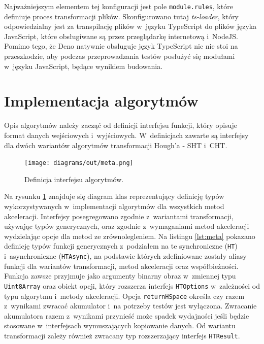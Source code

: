 Najważniejszym elementem tej konfiguracji jest pole \lstinline{module.rules}, które definiuje proces transformacji plików. Skonfigurowano tutaj \textit{ts-loader}, który odpowiedzialny jest za transpilację plików w~języku TypeScript do plików języka JavaScript, które obsługiwane są przez przeglądarkę internetową i~NodeJS. Pomimo tego, że Deno natywnie obsługuje język TypeScript nic nie stoi na przeszkodzie, aby podczas przeprowadzania testów posłużyć się modułami w~języku JavaScript, będące wynikiem budowania.

\section{Implementacja algorytmów}

Opis algorytmów należy zacząć od definicji interfejsu funkcji, który opisuje format danych wejściowych i~wyjściowych. W~definicjach zawarte są interfejsy dla dwóch wariantów algorytmów transformacji Hough'a - SHT i~CHT. 

\begin{figure}[h]
  \centering
  \texttt{[image: diagrams/out/meta.png]}
  \caption{Definicja interfejsu algorytmów.}
  \label{fig:meta}
\end{figure}

Na rysunku \ref{fig:meta} znajduje się diagram klas reprezentujący definicję typów wykorzystywanych w~implementacji algorytmów dla wszystkich metod akceleracji. Interfejsy posegregowano zgodnie z~wariantami transformacji, używając typów generycznych, oraz zgodnie z~wymaganiami metod akceleracji wydzielając opcje dla metod ze zrównolegleniem. Na listingu \ref{lst:meta} pokazano definicję typów funkcji generycznych z~podziałem na te synchroniczne (\lstinline{HT}) i~asynchroniczne (\lstinline{HTAsync}), na podstawie których zdefiniowane zostały aliasy funkcji dla wariantów transformacji, metod akceleracji oraz współbieżności. Funkcja zawsze przyjmuje jako argumenty binarny obraz w~zmiennej typu \lstinline{Uint8Array} oraz obiekt opcji, który rozszerza interfejs \lstinline{HTOptions} w~zależności od typu algorytmu i~metody akceleracji. Opcja \lstinline{returnHSpace} określa czy razem z~wynikami zwracać akumulator i~na potrzeby testów jest wyłączona. Zwracanie akumulatora razem z~wynikami przynieść może spadek wydajności jeśli będzie stosowane w~interfejsach wymuszających kopiowanie danych. Od wariantu transformacji zależy również zwracany typ rozszerzający interfejs \lstinline{HTResult}.


